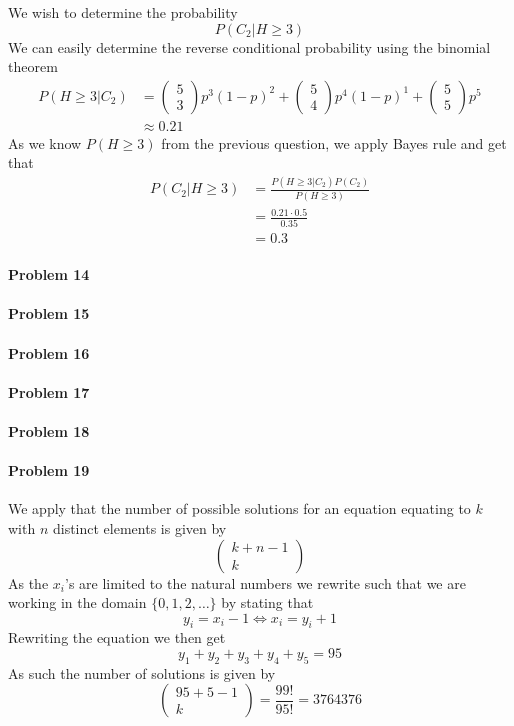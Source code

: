 We wish to determine the probability
\[
    P(C_{2}|H\geq 3)
\]
We can easily determine the reverse conditional probability using the binomial theorem
\begin{align*}
    P(H\geq 3|C_{2})&=\begin{pmatrix}5\\3\end{pmatrix}p^{3}(1-p)^{2}+\begin{pmatrix}5\\4\end{pmatrix}p^{4}(1-p)^{1}+\begin{pmatrix}5\\5\end{pmatrix}p^{5} \\
              &\approx 0.21
\end{align*}
As we know $P(H\geq 3)$ from the previous question, we apply Bayes rule and get that
\begin{align*}
    P(C_{2}|H\geq 3)&=\frac{P(H\geq 3|C_{2})P(C_2)}{P(H\geq 3)} \\
              &=\frac{0.21\cdot 0.5}{0.35} \\
              &=0.3
\end{align*}
\paragraph{Problem 14}
\paragraph{Problem 15}
\paragraph{Problem 16}
\paragraph{Problem 17}
\paragraph{Problem 18}
\paragraph{Problem 19}
We apply that the number of possible solutions for an equation equating to $k$ with $n$ distinct elements is given by
\[
    \begin{pmatrix}k+n-1\\k\end{pmatrix}
\]
As the $x_{i}$'s are limited to the natural numbers we rewrite such that we are working in the domain $\{0,1,2,\ldots\}$ by stating that
\[
    y_{i}=x_{i}-1\Leftrightarrow x_{i}=y_{i}+1
\]
Rewriting the equation we then get
\[
    y_{1}+y_{2}+y_{3}+y_{4}+y_{5}=95
\]
As such the number of solutions is given by
\[
    \begin{pmatrix}95+5-1\\k\end{pmatrix}=\frac{99!}{95!}=3764376
\]
